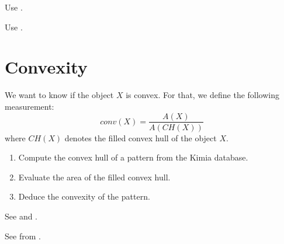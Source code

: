\vspace*{-4pt}

\begin{mcomment}
\begin{mremark}
Use .
\end{mremark}
\end{mcomment}

\begin{pcomment}
\begin{premark}
Use .
\end{premark}
\end{pcomment}


\section{Convexity}\vspace*{-8pt}
We want to know if the object $X$ is convex. For that, we define the following measurement:\vspace*{-8pt}
$$
conv(X)=\frac{A(X)}{A(CH(X))}
$$
where $CH(X)$ denotes the filled convex hull of the object $X$.

\begin{qbox}
\begin{enumerate}
	\item Compute the convex hull of a pattern from the Kimia database.
	\item Evaluate the area of the filled convex hull.
	\item Deduce the convexity of the pattern.
\end{enumerate}
\end{qbox}

\vspace*{-4pt}

\begin{mcomment}
\begin{mremark}
See  and .
\end{mremark}
\end{mcomment}


\begin{pcomment}
\begin{premark}
See  from .
\end{premark}
\end{pcomment}

